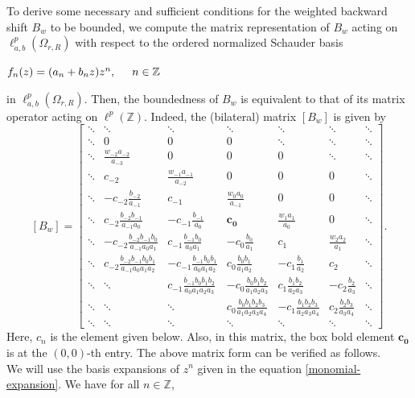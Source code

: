 \documentclass[12pt, reqno]{amsart}
\theoremstyle{definition}
\theoremstyle{remark}
\numberwithin{equation}{section}
\begin{document}
To derive some necessary and sufficient conditions for the weighted backward shift $B_w$ to be bounded, we compute the matrix representation of $B_w$ acting on $\ell^{p}_{a,b}(\Omega_{r,R})$ with respect to the ordered normalized Schauder basis
\begin{center}  
$f_n(z)= (a_n+b_{n}z)z^{n}, \hskip.5cm n\in \mathbb{Z}$
\end{center} 
in $\ell^{p}_{a,b}(\Omega_{r,R})$. Then, the boundedness of $B_w$ is equivalent to that of its matrix operator acting on $\ell^p(\mathbb{Z})$. Indeed, the (bilateral) matrix $[B_w]$ is given by
   \[   
  [B_w]=
  \begin{bmatrix}
  \ddots&  \ddots & \ddots & \ddots & \ddots&\ddots&\ddots\\
  \ddots& 0 & 0& 0&\ddots& \ddots&\ddots\\
  \ddots&\frac{w_{-2}a_{-2}}{a_{-3}} & 0& 0&0& \ddots&\ddots\\
\ddots& c_{-2}& \frac{w_{-1}a_{-1}}{a_{-2}} & 0&0 & 0 &\ddots\\
\ddots& -c_{-2}\frac{b_{-2}}{a_{-1}}& c_{-1} & \frac{w_{0}a_{0}}{a_{-1}} & 0&0&\ddots\\
  \ddots & c_{-2}\frac{b_{-2}b_{-1}}{a_{-1}a_{0}}&-c_{-1}\frac{b_{-1}}{a_{0}}&\boxed{\boldsymbol{c_{0}}} &\frac{w_{1}a_{1}}{a_{0}} &0&\ddots \\
	\ddots & -c_{-2}\frac{b_{-2}b_{-1}b_{0}}{a_{-1}a_{0}a_{1}}&c_{-1}\frac{b_{-1}b_{0}}{a_{0}a_{1}}&-c_{0}\frac{b_{0}}{a_{1}} & c_{1}&\frac{w_{2}a_{2}}{a_{1}}& \ddots\\
	\ddots & c_{-2}\frac{b_{-2}b_{-1}b_{0}b_{1}}{a_{-1}a_{0}a_{1}a_{2}} & -c_{-1}\frac{b_{-1}b_{0}b_{1}}{a_{0}a_{1}a_{2}}&c_{0}\frac{b_{0}b_{1}}{a_{1}a_{2}}&-c_{1}\frac{b_{1}}{a_{2}} &c_{2}&\ddots\\
	\ddots &  \ddots &c_{-1}\frac{b_{-1}b_{0}b_{1}b_{2}}{a_{0}a_{1}a_{2}a_{3}}&-c_{0}\frac{b_{0}b_{1}b_{2}}{a_{1}a_{2}a_{3}}&c_{1}\frac{b_{1}b_{2}}{a_{2}a_{3}}&-c_{2}\frac{b_{2}}{a_{3}} &\ddots\\
 \ddots &   \ddots & \ddots&c_{0}\frac{b_{0}b_{1}b_{2}b_{3}}{a_{1}a_{2}a_{3}a_{4}}&-c_{1}\frac{b_{1}b_{2}b_{3}}{a_{2}a_{3}a_{4}}&c_{2}\frac{b_{2}b_{3}}{a_{3}a_{4}} &\ddots\\
	  \ddots & \ddots & \ddots&\ddots&\ddots &\ddots&\ddots 
	\end{bmatrix}.
 \]
Here, $c_n$ is the element given below. Also, in this matrix, the box bold element $\boxed{\boldsymbol{c_{0}}} $ is at the $(0,0)$-th entry. The above matrix form can be verified as follows.\\We will use the basis expansions of $z^n$ given in the equation \eqref{monomial-expansion}. We have for all $n\in\mathbb{Z}$,
\end{document}

